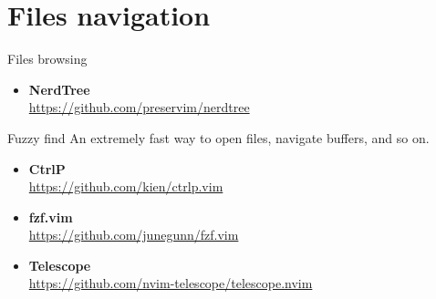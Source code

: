 \documentclass[aspectratio=169]{beamer}
\begin{document}
\section*{Files navigation}
\begin{frame}{\secname}

  \begin{block}{Files browsing}
    \begin{itemize}
      \item {\bf NerdTree}\\ \url{https://github.com/preservim/nerdtree}
    \end{itemize}
  \end{block}

  \begin{block}{Fuzzy find }
    An extremely fast way to open files, navigate buffers, and so on.
    \begin{itemize}
      \item {\bf CtrlP}\\ \url{https://github.com/kien/ctrlp.vim} 
      \item {\bf fzf.vim}\\ \url{https://github.com/junegunn/fzf.vim} 
      \item {\bf Telescope}\\ \url{https://github.com/nvim-telescope/telescope.nvim} 
    \end{itemize}
  \end{block}
    
\end{frame}

\end{document}
